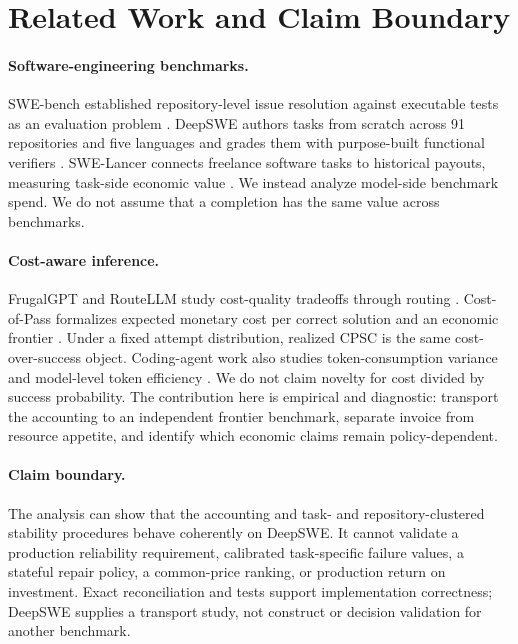 \documentclass[11pt]{article}
\begin{document}
\section{Related Work and Claim Boundary}

\paragraph{Software-engineering benchmarks.}
SWE-bench established repository-level issue resolution against executable tests as an evaluation
problem \citep{jimenez2024swebench}. DeepSWE authors tasks from scratch across 91 repositories and
five languages and grades them with purpose-built functional verifiers \citep{huang2026deepswe}.
SWE-Lancer connects freelance software tasks to historical payouts, measuring task-side economic
value \citep{miserendino2025swelancer}. We instead analyze model-side benchmark spend. We do not
assume that a completion has the same value across benchmarks.

\paragraph{Cost-aware inference.}
FrugalGPT and RouteLLM study cost-quality tradeoffs through routing \citep{chen2024frugalgpt,
ong2025routellm}. Cost-of-Pass formalizes expected monetary cost per correct solution and an
economic frontier \citep{erol2025costofpass}. Under a fixed attempt distribution, realized CPSC is
the same cost-over-success object. Coding-agent work also studies token-consumption variance and
model-level token efficiency \citep{bai2026spend}. We do not claim novelty for cost divided by
success probability. The contribution here is empirical and diagnostic: transport the accounting
to an independent frontier benchmark, separate invoice from resource appetite, and identify which
economic claims remain policy-dependent.

\paragraph{Claim boundary.}
The analysis can show that the accounting and task- and repository-clustered stability procedures
behave coherently on DeepSWE. It cannot validate a production reliability requirement, calibrated
task-specific failure values, a stateful repair policy, a common-price ranking, or production return on
investment. Exact reconciliation and tests support implementation correctness; DeepSWE supplies a
transport study, not construct or decision validation for another benchmark.
\end{document}
